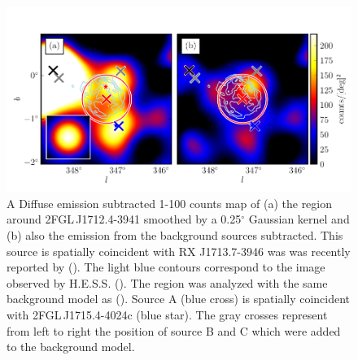 \documentclass[12pt,preprint]{aastex}
\newcommand{\gev}{\text{GeV}\xspace}
\newcommand{\tev}{\text{TeV}\xspace}
\renewcommand{\deg}{\ensuremath{^\circ}\xspace}
\begin{document}
\begin{figure}
  \begin{center}
    \includegraphics[type=pdf,ext=.pdf,read=.pdf]{source_plots/source_RX_J1713.7-3946}
  \end{center}
  \caption{A Diffuse emission subtracted 1-100 \gev
  counts map of (a) the region around 2FGL\,J1712.4-3941 smoothed by
  a 0.25\deg Gaussian kernel and (b) also the emission 
  from the background sources subtracted.
  This source is spatially
  coincident with RX J1713.7-3946 was was recently reported by
  (\cite{rx_j1713_lat}).  The light blue contours correspond to the \tev image
  observed by H.E.S.S. (\cite{rx_j1713_hess}).  The region was analyzed
  with the same background model as (\cite{rx_j1713_lat}).  Source A (blue
  cross) is spatially coincident with 2FGL\,J1715.4-4024c (blue star).
  The gray crosses represent from left to right the position of source B
  and C which were added to the background model. 
  }\label{2FGL_J1712.4-3941}
\end{figure}
\end{document}
